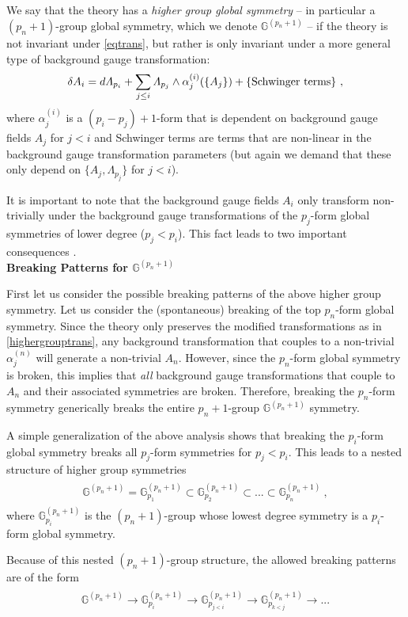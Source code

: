 \documentclass[11pt]{article}
\newcommand{\eq}[1]{\begin{align}\begin{split}#1\end{split}\end{align}}
\def\IG{\mathbb{G}}
\begin{document}
We say that the theory has a \emph{higher group global symmetry} -- in particular a $(p_n+1)$-group global symmetry, which we denote $\IG^{(p_n+1)}$ -- if the theory is  not invariant under \eqref{eqtrans}, but rather is only invariant under a more general type of background gauge transformation:
\eq{\label{highergrouptrans}
\delta  A_i=d\Lambda_{p_i}+\sum_{j\leq i}\Lambda_{p_j}\wedge \alpha_j^{(i)}(\{A_j\})+\{{\rm Schwinger~terms}\}~,
}
where $\alpha_j^{(i)}$ is a $(p_i-p_j)+1$-form that is dependent on background gauge fields $A_j$ for $j<i$ and Schwinger terms are terms that are non-linear in the background gauge transformation parameters (but again we demand that these only depend on $\{A_j,\Lambda_{p_j}\}$ for $j<i$). 

It is important to note that the background gauge fields $A_i$ only transform non-trivially under the background gauge transformations of the $p_j$-form global symmetries of lower degree ($p_{j}<p_i$). This fact leads to two important consequences \cite{Cordova:2018cvg,Brennan:2020ehu}. \\

\noindent\textbf{Breaking Patterns for $\IG^{(p_n+1)}$}

First let us consider the possible breaking patterns of the above higher group symmetry. Let us consider the (spontaneous) breaking of the top $p_n$-form global symmetry. Since the theory only preserves the modified transformations as in \eqref{highergrouptrans}, any background transformation that couples to a non-trivial $\alpha^{(n)}_j$ will generate a non-trivial $A_n$. However, since the $p_n$-form global symmetry is broken, this implies that \emph{all} background gauge transformations that couple to $A_n$ and their associated symmetries are broken. Therefore,  breaking the $p_n$-form symmetry generically breaks the entire $p_n+1$-group $\IG^{(p_n+1)}$  symmetry. 

A simple generalization of the above analysis shows that breaking the $p_i$-form global symmetry breaks all $p_j$-form symmetries for $p_j<p_i$. This leads to a nested structure of higher group symmetries 
\eq{
\IG^{(p_n+1)}=\IG^{(p_n+1)}_{p_1}\subset \IG^{(p_n+1)}_{p_2} \subset ... \subset \IG^{(p_n+1)}_{p_n}~,
}
where $\IG^{(p_n+1)}_{p_i}$ is the $(p_n+1)$-group whose lowest degree symmetry is a $p_i$-form global symmetry. 

Because of this nested $(p_n+1)$-group structure, the allowed breaking patterns are of the form 
\eq{\label{highergroupnested}
\IG^{(p_n+1)}\longrightarrow \IG^{(p_n+1)}_{p_i}\longrightarrow \IG^{(p_n+1)}_{p_{j<i}}\longrightarrow \IG^{(p_n+1)}_{p_{k<j}}\longrightarrow ... 
}
\end{document}
